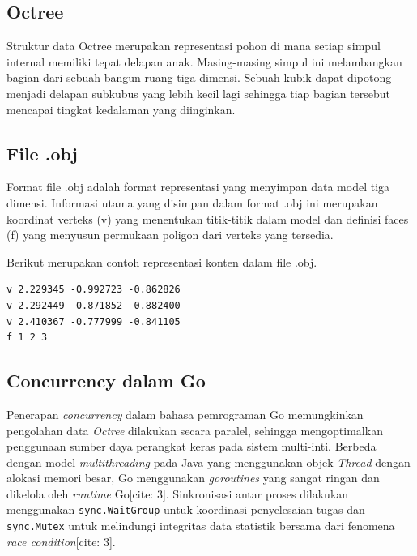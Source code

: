\subsection{Octree}\label{sub:Octree} %
Struktur data Octree merupakan representasi pohon di mana setiap
simpul internal memiliki tepat delapan anak. Masing-masing simpul ini
melambangkan bagian dari sebuah bangun ruang tiga dimensi. Sebuah
kubik dapat dipotong menjadi delapan subkubus yang lebih kecil lagi
sehingga tiap bagian tersebut mencapai tingkat kedalaman yang diinginkan.

\subsection{File .obj}\label{sub:File .obj} %
Format file .obj adalah format representasi yang menyimpan
data model tiga dimensi. Informasi utama yang
disimpan dalam format .obj ini merupakan koordinat verteks (v) yang
menentukan titik-titik dalam model
dan definisi faces (f) yang menyusun permukaan poligon dari verteks
yang tersedia.

Berikut merupakan contoh representasi konten dalam file .obj.

\begin{tcolorbox}[colback=white,
    colframe=black, sharp corners, boxrule=0.5pt]
    \begin{verbatim}
v 2.229345 -0.992723 -0.862826
v 2.292449 -0.871852 -0.882400
v 2.410367 -0.777999 -0.841105
f 1 2 3
    \end{verbatim}
\end{tcolorbox}

\subsection{Concurrency dalam Go}\label{sub:Concurrency dalam Go} %
Penerapan \textit{concurrency} dalam bahasa pemrograman Go
memungkinkan pengolahan data \textit{Octree} dilakukan secara
paralel, sehingga mengoptimalkan penggunaan sumber daya perangkat
keras pada sistem multi-inti. Berbeda dengan model
\textit{multithreading} pada Java yang menggunakan objek
\textit{Thread} dengan alokasi memori besar, Go menggunakan
\textit{goroutines} yang sangat ringan dan dikelola oleh
\textit{runtime} Go[cite: 3]. Sinkronisasi antar proses dilakukan
menggunakan \texttt{sync.WaitGroup} untuk koordinasi penyelesaian
tugas dan \texttt{sync.Mutex} untuk melindungi integritas data
statistik bersama dari fenomena \textit{race condition}[cite: 3].

